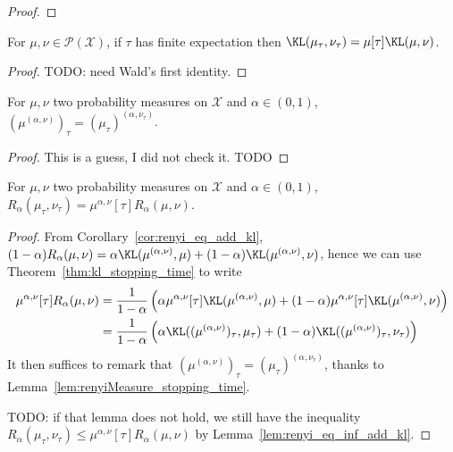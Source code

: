 \begin{proof}%
\uses{}

\end{proof}


\begin{theorem}
  \label{thm:kl_stopping_time}
  For $\mu, \nu \in \mathcal P(\mathcal X)$, if $\tau$ has finite expectation then $\KL(\mu_\tau, \nu_\tau) = \mu[\tau] \KL(\mu, \nu)$.
\end{theorem}

\begin{proof}
TODO: need Wald's first identity.
\end{proof}


\begin{lemma}
  \label{lem:renyiMeasure_stopping_time}
  For $\mu, \nu$ two probability measures on $\mathcal X$ and $\alpha \in (0,1)$, $(\mu^{(\alpha, \nu)})_\tau = (\mu_\tau)^{(\alpha, \nu_\tau)}$.
\end{lemma}

\begin{proof}
This is a guess, I did not check it. TODO
\end{proof}


\begin{theorem}
  \label{thm:renyi_stopping_time}
  For $\mu, \nu$ two probability measures on $\mathcal X$ and $\alpha \in (0,1)$,
  $R_\alpha(\mu_\tau, \nu_\tau) = \mu^{\alpha, \nu}[\tau] R_\alpha(\mu, \nu)$.
\end{theorem}

\begin{proof}
From Corollary~\ref{cor:renyi_eq_add_kl}, $(1 - \alpha) R_\alpha(\mu, \nu) = \alpha \KL(\mu^{(\alpha, \nu)}, \mu) + (1 - \alpha)\KL(\mu^{(\alpha, \nu)}, \nu)$, hence we can use Theorem~\ref{thm:kl_stopping_time} to write
\begin{align*}
\mu^{\alpha, \nu}[\tau] R_\alpha(\mu, \nu)
&= \frac{1}{1 - \alpha}\left(\alpha \mu^{\alpha, \nu}[\tau]\KL(\mu^{(\alpha, \nu)}, \mu) + (1 - \alpha)\mu^{\alpha, \nu}[\tau]\KL(\mu^{(\alpha, \nu)}, \nu) \right)
\\
&= \frac{1}{1 - \alpha}\left(\alpha \KL((\mu^{(\alpha, \nu)})_\tau, \mu_\tau) + (1 - \alpha)\KL((\mu^{(\alpha, \nu)})_\tau, \nu_\tau) \right)
\end{align*}
It then suffices to remark that $(\mu^{(\alpha, \nu)})_\tau = (\mu_\tau)^{(\alpha, \nu_\tau)}$, thanks to Lemma~\ref{lem:renyiMeasure_stopping_time}.

TODO: if that lemma does not hold, we still have the inequality $R_\alpha(\mu_\tau, \nu_\tau) \le \mu^{\alpha, \nu}[\tau] R_\alpha(\mu, \nu)$ by Lemma~\ref{lem:renyi_eq_inf_add_kl}.
\end{proof}

